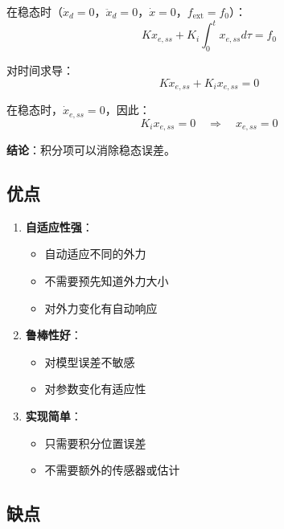 \documentclass[12pt,a4paper]{article}
\begin{document}
在稳态时（$\dot{x}_d = 0$，$\ddot{x}_d = 0$，$\dot{x} = 0$，$f_{\text{ext}} = f_0$）：
\begin{equation}
K x_{e,ss} + K_i \int_0^t x_{e,ss} d\tau = f_0
\end{equation}

对时间求导：
\begin{equation}
K \dot{x}_{e,ss} + K_i x_{e,ss} = 0
\end{equation}

在稳态时，$\dot{x}_{e,ss} = 0$，因此：
\begin{equation}
K_i x_{e,ss} = 0 \quad \Rightarrow \quad x_{e,ss} = 0
\end{equation}

\textbf{结论}：积分项可以消除稳态误差。

\subsection{优点}

\begin{enumerate}
\item \textbf{自适应性强}：
\begin{itemize}
\item 自动适应不同的外力
\item 不需要预先知道外力大小
\item 对外力变化有自动响应
\end{itemize}

\item \textbf{鲁棒性好}：
\begin{itemize}
\item 对模型误差不敏感
\item 对参数变化有适应性
\end{itemize}

\item \textbf{实现简单}：
\begin{itemize}
\item 只需要积分位置误差
\item 不需要额外的传感器或估计
\end{itemize}
\end{enumerate}

\subsection{缺点}
\end{document}
